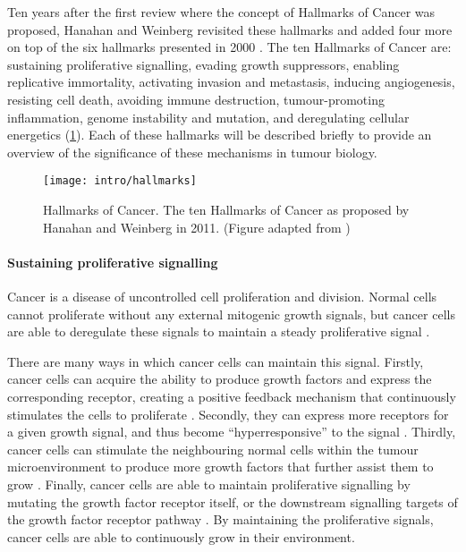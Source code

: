 Ten years after the first review where the concept of Hallmarks of Cancer was proposed, Hanahan and Weinberg revisited these hallmarks and added four more on top of the six hallmarks presented in 2000 \citep{Hanahan2011}.
The ten Hallmarks of Cancer are: sustaining proliferative signalling, evading growth suppressors, enabling replicative immortality, activating invasion and metastasis, inducing angiogenesis, resisting cell death, avoiding immune destruction, tumour-promoting inflammation, genome instability and mutation, and deregulating cellular energetics (\cref{fig:hallmarks}).
Each of these hallmarks will be described briefly to provide an overview of the significance of these mechanisms in tumour biology.

\begin{figure}[htb!]
	\centering
	\texttt{[image: intro/hallmarks]}
	\caption[Hallmarks of Cancer]{Hallmarks of Cancer. The ten Hallmarks of Cancer as proposed by Hanahan and Weinberg in 2011. (Figure adapted from \citet{Hanahan2011})}
	\label{fig:hallmarks}
\end{figure}

\paragraph{Sustaining proliferative signalling}

\noindent
Cancer is a disease of uncontrolled cell proliferation and division.
Normal cells cannot proliferate without any external mitogenic growth signals, but cancer cells are able to deregulate these signals to maintain a steady proliferative signal \citep{Hanahan2011}.

There are many ways in which cancer cells can maintain this signal.
Firstly, cancer cells can acquire the ability to produce growth factors and express the corresponding receptor, creating a positive feedback mechanism that continuously stimulates the cells to proliferate \citep{Hanahan2000}.
Secondly, they can express more receptors for a given growth signal, and thus become ``hyperresponsive'' to the signal \citep{Hanahan2000,Hanahan2011}.
Thirdly, cancer cells can stimulate the neighbouring normal cells within the tumour microenvironment to produce more growth factors that further assist them to grow \citep{Bhowmick2004, Liotta2001, Wiseman2002}.
Finally, cancer cells are able to maintain proliferative signalling by mutating the growth factor receptor itself, or the downstream signalling targets of the growth factor receptor pathway \citep{Fuqua1991,SuHuang1997,Satyamoorthy2003}.
By maintaining the proliferative signals, cancer cells are able to continuously grow in their environment.

